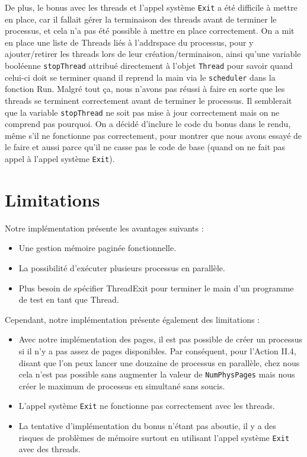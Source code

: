 \documentclass[a4paper,11pt]{article}
\begin{document}
De plus, le bonus avec les threads et l'appel système \texttt{Exit} a été difficile à mettre en place, car il fallait gérer la terminaison des threads avant de terminer le processus, et cela n'a pas été possible à mettre en place correctement.
On a mit en place une liste de Threads liés à l'addrspace du processus, pour y ajouter/retirer les threads lors de leur création/terminaison, ainsi qu'une variable booléenne \texttt{stopThread} attribué directement à l'objet \texttt{Thread} pour savoir quand celui-ci doit se terminer quand il reprend la main via le \texttt{scheduler} dans la fonction Run.
Malgré tout ça, nous n'avons pas réussi à faire en sorte que les threads se terminent correctement avant de terminer le processus. Il semblerait que la variable \texttt{stopThread} ne soit pas mise à jour correctement mais on ne comprend pas pourquoi.
On a décidé d'inclure le code du bonus dans le rendu, même s'il ne fonctionne pas correctement, pour montrer que nous avons essayé de le faire et aussi parce qu'il ne casse pas le code de base (quand on ne fait pas appel à l'appel système \texttt{Exit}).


\section{Limitations}
Notre implémentation présente les avantages suivants :
\begin{itemize}
    \item Une gestion mémoire paginée fonctionnelle.
    \item La possibilité d’exécuter plusieurs processus en parallèle.
    \item Plus besoin de spécifier ThreadExit pour terminer le main d'un programme de test en tant que Thread.
\end{itemize}

Cependant, notre implémentation présente également des limitations :
\begin{itemize}
    \item Avec notre implémentation des pages, il est pas possible de créer un processus si il n'y a pas assez de pages disponibles. Par conséquent, pour l'Action II.4, disant que l'on peux lancer une douzaine de processus en parallèle, chez nous cela n'est pas possible sans augmenter la valeur de \texttt{NumPhysPages} mais nous créer le maximum de processus en simultané sans soucis.
    \item L'appel système \texttt{Exit} ne fonctionne pas correctement avec les threads.
    \item La tentative d'implémentation du bonus n'étant pas aboutie, il y a des risques de problèmes de mémoire surtout en utilisant l'appel système \texttt{Exit} avec des threads.
\end{itemize}
\end{document}
